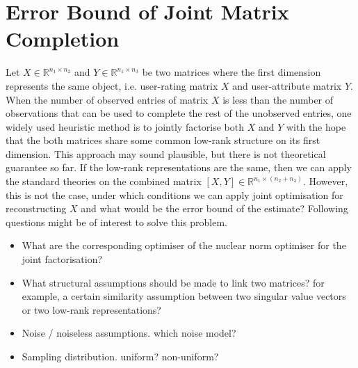 \documentclass{article} %
\theoremstyle{definition}
\begin{document}
\section{Error Bound of Joint Matrix Completion}
Let $X \in \mathbb{R}^{n_1 \times n_2}$ and $Y \in \mathbb{R}^{n_1 \times n_3}$ be two matrices where the first dimension represents the same object, i.e. user-rating matrix $X$ and user-attribute matrix $Y$. When the number of observed entries of matrix $X$ is less than the number of observations that can be used to complete the rest of the unobserved entries, one widely used heuristic method is to jointly factorise both $X$ and $Y$ with the hope that the both matrices share some common low-rank structure on its first dimension. This approach may sound plausible, but there is not theoretical guarantee so far.
If the low-rank representations are the same, then we can apply the standard theories on the combined matrix $[X, Y] \in \mathbb{R}^{n_1 \times (n_2 + n_3)}$. However, this is not the case, under which conditions we can apply joint optimisation for reconstructing $X$ and what would be the error bound of the estimate? Following questions might be of interest to solve this problem.
\begin{itemize}
\item What are the corresponding optimiser of the nuclear norm optimiser for the joint factorisation?
\item What structural assumptions should be made to link two matrices? for example, a certain similarity assumption between two singular value vectors or two low-rank representations? 
\item Noise / noiseless assumptions. which noise model?
\item Sampling distribution. uniform? non-uniform?
\end{itemize}
\end{document}
